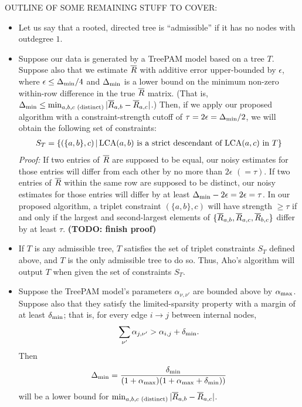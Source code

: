 \documentclass{article}
\theoremstyle{definition}
\begin{document}
OUTLINE OF SOME REMAINING STUFF TO COVER:
\begin{itemize}
\item Let us say that a rooted, directed tree is ``admissible'' if it has no nodes with outdegree $1$.
%
\item Suppose our data is generated by a TreePAM model based on a tree $T$.
Suppose also that we estimate $\overline{R}$ with additive error upper-bounded by $\epsilon$, where $\epsilon \leq \Delta_{\text{min}}/4$ and $\Delta_{\text{min}}$ is a lower bound on the minimum non-zero within-row difference in the true $\overline{R}$ matrix.
(That is, $\Delta_{\text{min}} \leq \min_{a,b,c \text{ (distinct)}} |\overline{R}_{a,b} - \overline{R}_{a,c}|$.)
Then, if we apply our proposed algorithm with a constraint-strength cutoff of $\tau = 2\epsilon = \Delta_{\text{min}}/2$, we will obtain the following set of constraints:
\begin{align*}
S_T = \{ (\{a,b\},c) \,|\, \text{LCA}(a,b) \text{ is a strict descendant of } \text{LCA}(a,c) \text{ in } T \}
\end{align*}
\emph{Proof:}
If two entries of $\overline{R}$ are supposed to be equal, our noisy estimates for those entries will differ from each other by no more than $2\epsilon$ $(=\tau)$.
If two entries of $\overline{R}$ within the same row are supposed to be distinct, our noisy estimates for those entries will differ by at least $\Delta_{\text{min}} - 2\epsilon = 2\epsilon = \tau$.
In our proposed algorithm, a triplet constraint $(\{a,b\},c)$ will have strength $\geq \tau$ if and only if the largest and second-largest elements of $\{\overline{R}_{a,b}, \overline{R}_{a,c}, \overline{R}_{b,c}\}$ differ by at least $\tau$.
{\bf (TODO: finish proof)}
%
\item If $T$ is any admissible tree, $T$ satisfies the set of triplet constraints $S_T$ defined above, and $T$ is the only admissible tree to do so.
Thus, Aho's algorithm will output $T$ when given the set of constraints $S_T$.
%
\item Suppose the TreePAM model's parameters $\alpha_{\nu,\nu'}$ are bounded above by $\alpha_{\text{max}}$.
Suppose also that they satisfy the limited-sparsity property with a margin of at least $\delta_{\text{min}}$; that is, for every edge $i \to j$ between internal nodes,
\begin{align*}
\sum_{\nu'} \alpha_{j,\nu'} > \alpha_{i,j} + \delta_{\text{min}}.
\end{align*}
Then
\begin{align*}
\Delta_{\text{min}} = \frac{\delta_{\text{min}}}{(1+\alpha_{\text{max}})(1+\alpha_{\text{max}}+\delta_{\text{min}}))}
\end{align*}
will be a lower bound for $\min_{a,b,c \text{ (distinct)}} |\overline{R}_{a,b} - \overline{R}_{a,c}|$.

\end{itemize}
\end{document}
